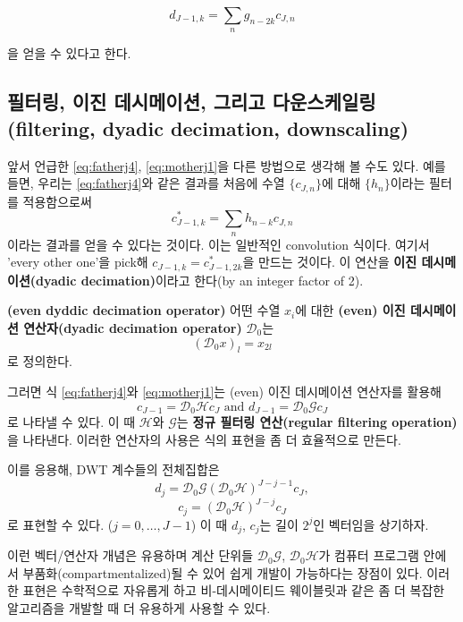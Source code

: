 \documentclass[b5paper,]{scrbook}
\theoremstyle{plain}
\theoremstyle{definition}
\numberwithin{equation}{section}
\let\BeginKnitrBlock\begin \let\EndKnitrBlock\end
\begin{document}
\begin{equation}
d_{J-1,k}=\sum_{n}g_{n-2k}c_{J,n}
\label{eq:motherj1}
\end{equation}

을 얻을 수 있다고 한다.

\hypertarget{----filtering-dyadic-decimation-downscaling}{%
\subsection{필터링, 이진 데시메이션, 그리고 다운스케일링(filtering, dyadic decimation, downscaling)}\label{----filtering-dyadic-decimation-downscaling}}

앞서 언급한 \eqref{eq:fatherj4}, \eqref{eq:motherj1}을 다른 방법으로 생각해 볼 수도 있다. 예를 들면, 우리는 \eqref{eq:fatherj4}와 같은 결과를 처음에 수열 \(\{c_{J,n}\}\)에 대해 \(\{h_{n}\}\)이라는 필터를 적용함으로써
\[c_{J-1,k}^{*}=\sum_{n}h_{n-k}c_{J,n}\]
이라는 결과를 얻을 수 있다는 것이다. 이는 일반적인 convolution 식이다. 여기서 'every other one'을 pick해 \(c_{J-1,k}=c_{J-1,2k}^{*}\)을 만드는 것이다. 이 연산을 \textbf{이진 데시메이션(dyadic decimation)}이라고 한다(by an integer factor of 2).

\BeginKnitrBlock{definition}[이진 데시메이션]
\protect\hypertarget{def:unnamed-chunk-284}{}{\label{def:unnamed-chunk-284} {} }\textbf{(even dyddic decimation operator)} 어떤 수열 \(x_{i}\)에 대한 \textbf{(even) 이진 데시메이션 연산자(dyadic decimation operator)} \(\mathcal{D}_{0}\)는
\[(\mathcal{D}_{0}x)_{l}=x_{2l}\]
로 정의한다.
\EndKnitrBlock{definition}

그러면 식 \eqref{eq:fatherj4}와 \eqref{eq:motherj1}는 (even) 이진 데시메이션 연산자를 활용해
\[c_{J-1}=\mathcal{D}_{0}\mathcal{H}c_{J} \text{ and } d_{J-1}=\mathcal{D}_{0}\mathcal{G}c_{J}\]
로 나타낼 수 있다. 이 때 \(\mathcal{H}\)와 \(\mathcal{G}\)는 \textbf{정규 필터링 연산(regular filtering operation)}을 나타낸다. 이러한 연산자의 사용은 식의 표현을 좀 더 효율적으로 만든다.

이를 응용해, DWT 계수들의 전체집합은
\[d_{j}=\mathcal{D}_{0}\mathcal{G}(\mathcal{D}_{0}\mathcal{H})^{J-j-1}c_{J},\]
\[c_{j}=(\mathcal{D}_{0}\mathcal{H})^{J-j}c_{J}\]
로 표현할 수 있다. (\(j=0,\ldots , J-1\)) 이 때 \(d_{j}\), \(c_{j}\)는 길이 \(2^{j}\)인 벡터임을 상기하자.

이런 벡터/연산자 개념은 유용하며 계산 단위들 \(\mathcal{D}_{0}\mathcal{G}\), \(\mathcal{D}_{0}\mathcal{H}\)가 컴퓨터 프로그램 안에서 부품화(compartmentalized)될 수 있어 쉽게 개발이 가능하다는 장점이 있다. 이러한 표현은 수학적으로 자유롭게 하고 비-데시메이티드 웨이블릿과 같은 좀 더 복잡한 알고리즘을 개발할 때 더 유용하게 사용할 수 있다.
\end{document}
